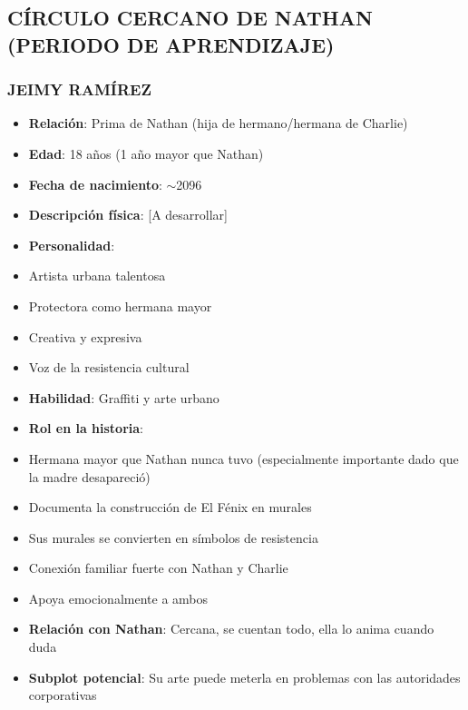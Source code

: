 \documentclass[11pt,a4paper]{report}
\begin{document}
\subsection{CÍRCULO CERCANO DE NATHAN (PERIODO DE APRENDIZAJE)}

\subsubsection{JEIMY RAMÍREZ}
\begin{itemize}
  \item \textbf{Relación}: Prima de Nathan (hija de hermano/hermana de Charlie)
  \item \textbf{Edad}: 18 años (1 año mayor que Nathan)
  \item \textbf{Fecha de nacimiento}: $\sim$2096
  \item \textbf{Descripción física}: [A desarrollar]
  \item \textbf{Personalidad}: 
  \item Artista urbana talentosa
  \item Protectora como hermana mayor
  \item Creativa y expresiva
  \item Voz de la resistencia cultural
  \item \textbf{Habilidad}: Graffiti y arte urbano
  \item \textbf{Rol en la historia}: 
  \item Hermana mayor que Nathan nunca tuvo (especialmente importante dado que la madre desapareció)
  \item Documenta la construcción de El Fénix en murales
  \item Sus murales se convierten en símbolos de resistencia
  \item Conexión familiar fuerte con Nathan y Charlie
  \item Apoya emocionalmente a ambos
  \item \textbf{Relación con Nathan}: Cercana, se cuentan todo, ella lo anima cuando duda
  \item \textbf{Subplot potencial}: Su arte puede meterla en problemas con las autoridades corporativas

\end{itemize}
\end{document}
